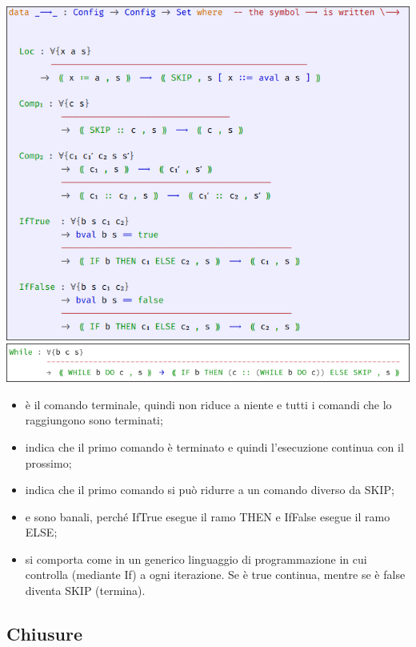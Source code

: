 \begin{center}
  \includegraphics[scale = 0.5]{images/IMP/R1.png}
  \includegraphics[scale = 0.51]{images/IMP/R2.png}
\end{center}

\begin{itemize}
  \item {} è il comando terminale, quindi non riduce a niente e tutti i comandi che lo raggiungono sono terminati;
  \item {} indica che il primo comando è terminato e quindi l'esecuzione continua con il prossimo;
  \item {} indica che il primo comando si può ridurre a un comando diverso da SKIP;
  \item {} e  sono banali, perché IfTrue esegue il ramo THEN e IfFalse esegue il ramo ELSE;
  \item {} si comporta come in un generico linguaggio di programmazione in cui controlla (mediante If) a ogni iterazione. Se è true continua, mentre se è false diventa SKIP (termina).
\end{itemize}

\pagebreak

\subsection{Chiusure}

